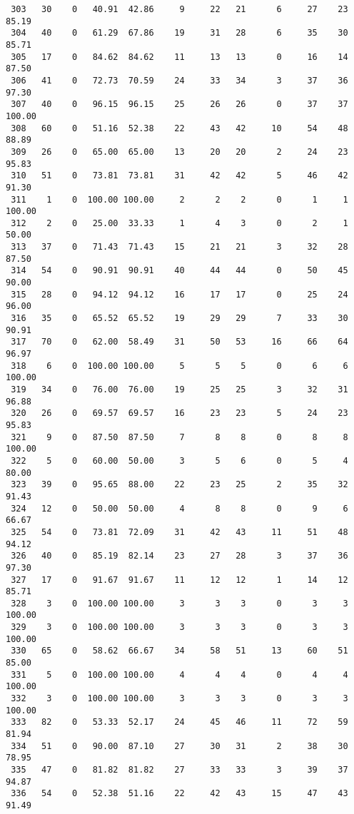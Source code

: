 \begin{verbatim}
 303   30    0   40.91  42.86     9     22   21      6     27    23    85.19
 304   40    0   61.29  67.86    19     31   28      6     35    30    85.71
 305   17    0   84.62  84.62    11     13   13      0     16    14    87.50
 306   41    0   72.73  70.59    24     33   34      3     37    36    97.30
 307   40    0   96.15  96.15    25     26   26      0     37    37   100.00
 308   60    0   51.16  52.38    22     43   42     10     54    48    88.89
 309   26    0   65.00  65.00    13     20   20      2     24    23    95.83
 310   51    0   73.81  73.81    31     42   42      5     46    42    91.30
 311    1    0  100.00 100.00     2      2    2      0      1     1   100.00
 312    2    0   25.00  33.33     1      4    3      0      2     1    50.00
 313   37    0   71.43  71.43    15     21   21      3     32    28    87.50
 314   54    0   90.91  90.91    40     44   44      0     50    45    90.00
 315   28    0   94.12  94.12    16     17   17      0     25    24    96.00
 316   35    0   65.52  65.52    19     29   29      7     33    30    90.91
 317   70    0   62.00  58.49    31     50   53     16     66    64    96.97
 318    6    0  100.00 100.00     5      5    5      0      6     6   100.00
 319   34    0   76.00  76.00    19     25   25      3     32    31    96.88
 320   26    0   69.57  69.57    16     23   23      5     24    23    95.83
 321    9    0   87.50  87.50     7      8    8      0      8     8   100.00
 322    5    0   60.00  50.00     3      5    6      0      5     4    80.00
 323   39    0   95.65  88.00    22     23   25      2     35    32    91.43
 324   12    0   50.00  50.00     4      8    8      0      9     6    66.67
 325   54    0   73.81  72.09    31     42   43     11     51    48    94.12
 326   40    0   85.19  82.14    23     27   28      3     37    36    97.30
 327   17    0   91.67  91.67    11     12   12      1     14    12    85.71
 328    3    0  100.00 100.00     3      3    3      0      3     3   100.00
 329    3    0  100.00 100.00     3      3    3      0      3     3   100.00
 330   65    0   58.62  66.67    34     58   51     13     60    51    85.00
 331    5    0  100.00 100.00     4      4    4      0      4     4   100.00
 332    3    0  100.00 100.00     3      3    3      0      3     3   100.00
 333   82    0   53.33  52.17    24     45   46     11     72    59    81.94
 334   51    0   90.00  87.10    27     30   31      2     38    30    78.95
 335   47    0   81.82  81.82    27     33   33      3     39    37    94.87
 336   54    0   52.38  51.16    22     42   43     15     47    43    91.49

\end{verbatim}
